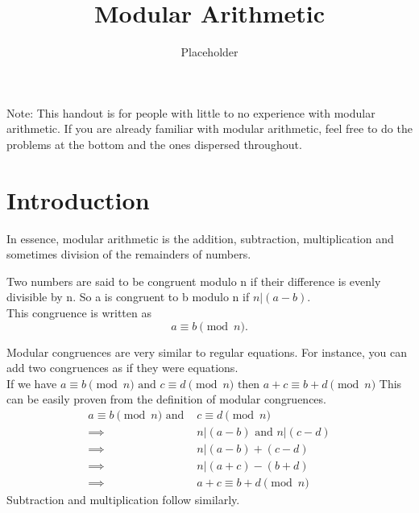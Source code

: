 \documentclass{article}
\begin{document}
\title{Modular Arithmetic}
\author{Placeholder}
\maketitle
Note: This handout is for people with little to no experience with modular arithmetic. If you are already familiar with modular arithmetic, feel free to do the problems at the bottom and the ones dispersed throughout.

\section*{Introduction}
\indent In essence, modular arithmetic is the addition, subtraction, multiplication and sometimes division 
of the remainders of numbers.

Two numbers are said to be congruent modulo n if their difference is evenly divisible by n.
So a is congruent to b modulo n if $n | (a-b)$. \\
This congruence is written as 
$$ a \equiv b \pmod{n}.$$

Modular congruences are very similar to regular equations. For instance, you can add two congruences as if they were equations.\\
If we have 
$
    a \equiv b \pmod{n} \text{ and } c \equiv d \pmod{n} \text{ then } a+c \equiv b+d \pmod{n}
$
This can be easily proven from the definition of modular congruences. 
\begin{align*}
    a \equiv b \pmod{n} \text{  and  } &c \equiv d \pmod{n}\\
    \implies &n|(a-b) \text{  and  } n|(c-d) \\
    \implies &n|(a-b)+(c-d)\\
    \implies &n|(a+c)-(b+d)\\
    \implies &\boxed{a+c \equiv b+d \pmod{n}}
\end{align*}
Subtraction and multiplication follow similarly.\\
\end{document}
